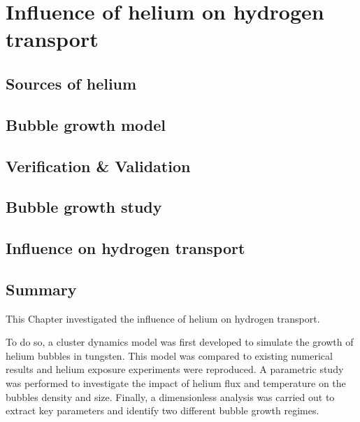 \setchapterpreamble[u]{\margintoc}
\chapter{Influence of helium on hydrogen transport}
\label{Chapter5} %



\section{Sources of helium}


\section{Bubble growth model}


\section{Verification \& Validation}


\section{Bubble growth study}


\section{Influence on hydrogen transport}


\section{Summary}

This Chapter investigated the influence of helium on hydrogen transport.

To do so, a cluster dynamics model was first developed to simulate the growth of helium bubbles in tungsten.
This model was compared to existing numerical results and helium exposure experiments were reproduced.
A parametric study was performed to investigate the impact of helium flux and temperature on the bubbles density and size.
Finally, a dimensionless analysis was carried out to extract key parameters and identify two different bubble growth regimes.

